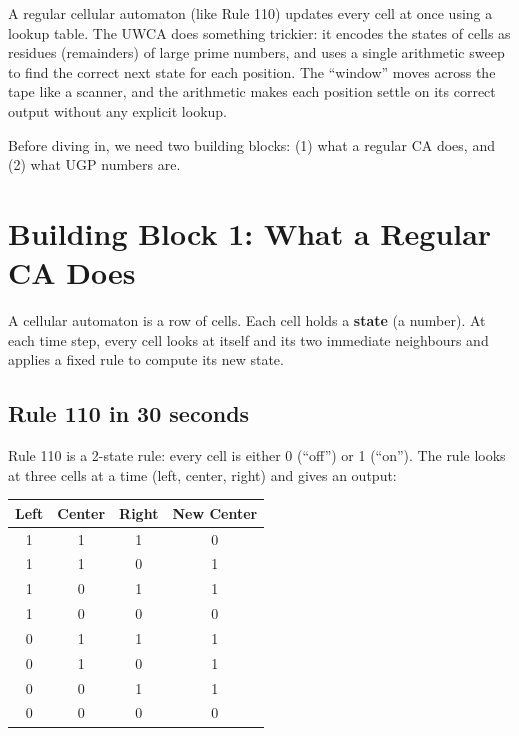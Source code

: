 \documentclass[11pt,a4paper]{article}
\newcommand{\term}[1]{\textbf{#1}}
\begin{document}
\begin{tcolorbox}[colback=boxtan,colframe=orange!50!black,title=The idea]
A regular cellular automaton (like Rule 110) updates every cell at once using
a lookup table.  The UWCA does something trickier: it encodes the states of
cells as residues (remainders) of large prime numbers, and uses a single
arithmetic sweep to find the correct next state for each position.  The
``window'' moves across the tape like a scanner, and the arithmetic makes
each position settle on its correct output without any explicit lookup.
\end{tcolorbox}

\bigskip
Before diving in, we need two building blocks: (1) what a regular CA does,
and (2) what UGP numbers are.

\section{Building Block 1: What a Regular CA Does}

A cellular automaton is a row of cells.  Each cell holds a \term{state}
(a number).  At each time step, every cell looks at itself and its two
immediate neighbours and applies a fixed rule to compute its new state.

\subsection{Rule 110 in 30 seconds}

Rule 110 is a 2-state rule: every cell is either 0 (``off'') or 1 (``on'').
The rule looks at three cells at a time (left, center, right) and gives an
output:

\begin{center}
\begin{tabular}{ccc|c}
\toprule
Left & Center & Right & New Center \\
\midrule
1 & 1 & 1 & 0 \\
1 & 1 & 0 & 1 \\
1 & 0 & 1 & 1 \\
1 & 0 & 0 & 0 \\
0 & 1 & 1 & 1 \\
0 & 1 & 0 & 1 \\
0 & 0 & 1 & 1 \\
0 & 0 & 0 & 0 \\
\bottomrule
\end{tabular}
\end{center}
\end{document}
